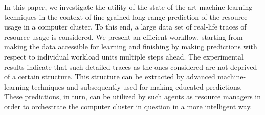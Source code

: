 In this paper, we investigate the utility of the state-of-the-art
machine-learning techniques in the context of fine-grained long-range prediction
of the resource usage in a computer cluster. To this end, a large data set of
real-life traces of resource usage is considered. We present an efficient
workflow, starting from making the data accessible for learning and finishing by
making predictions with respect to individual workload units multiple steps
ahead. The experimental results indicate that such detailed traces as the ones
considered are not deprived of a certain structure. This structure can be
extracted by advanced machine-learning techniques and subsequently used for
making educated predictions. These predictions, in turn, can be utilized by such
agents as resource managers in order to orchestrate the computer cluster in
question in a more intelligent way.
